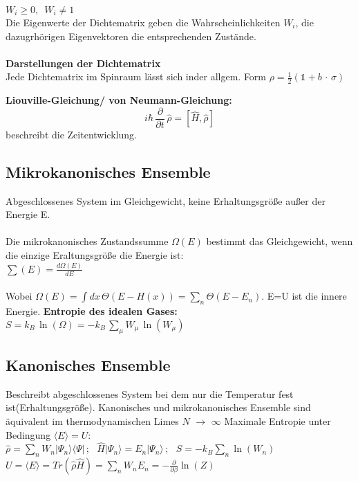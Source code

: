 \documentclass[a4paper,11pt]{scrartcl}
\begin{document}
$W_i \geq 0, \,\,\, W_i \neq 1$ \\
Die Eigenwerte der Dichtematrix geben die Wahrscheinlichkeiten $W_i$, die dazugrhörigen Eigenvektoren die entsprechenden Zustände.\\
\\
\textbf{Darstellungen der Dichtematrix}\\
Jede Dichtematrix im Spinraum lässt sich inder allgem. Form $\rho = \frac{1}{2} ( \mathbb{1} + b \,\cdot \, \sigma)$


\textbf{ Liouville-Gleichung/ von Neumann-Gleichung: }\\
\begin{equation}
 i \hbar \, \frac{\partial}{\partial t} \, \hat{\rho} = \left[ \hat{H}, \hat{\rho} \right]
\end{equation}
beschreibt die Zeitentwicklung.

\subsection{Mikrokanonisches Ensemble}
Abgeschlossenes System im Gleichgewicht, keine Erhaltungsgröße außer der Energie E.\\
\\
Die mikrokanonisches Zustandssumme $\Omega(E) $ bestimmt das Gleichgewicht, wenn die einzige Eraltungsgröße die Energie ist:\\
$ \sum (E) = \frac{d \Omega (E)}{d E}$\\
\\
Wobei $\Omega(E) = \int dx \, \Theta (E-H(x)) = \sum_n \Theta (E-E_n) $. E=U ist die innere Energie. 
\textbf{Entropie des idealen Gases:}\\
$S= k_B \, \ln(\Omega) = - k_B \, \sum_{\mu} W_{\mu} \, \ln(W_{\mu})$

\subsection{Kanonisches Ensemble}
Beschreibt abgeschlossenes System bei dem nur die Temperatur fest ist(Erhaltungsgröße).
Kanonisches und mikrokanonisches Ensemble sind äquivalent im thermodynamischen Limes $N \,\,  \rightarrow \,\, \infty$
Maximale Entropie unter Bedingung $\langle E \rangle = U$:
$\hat{\rho}= \sum_n W_n | \Psi_n \rangle \langle \Psi | \, ; \,\,\,\, \hat{H} | \Psi_n \rangle = E_n | \Psi_n \rangle \, ; \,\,\,\, S = -k_B \sum_n \ln(W_n)$\\
$U = \langle E \rangle = Tr(\hat{\rho}\hat{H}) = \sum_n W_n E_n = - \frac{\partial}{\partial \beta} \ln (Z)$
\end{document}
